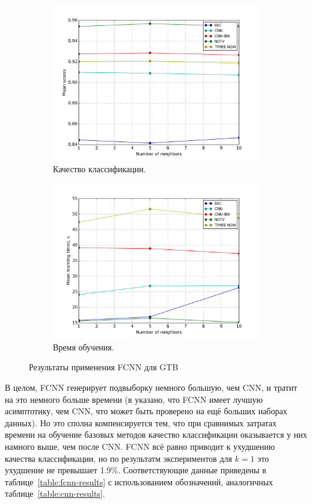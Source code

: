 \begin{figure}
	\centering
	\begin{subfigure}{0.45\textwidth}
		\includegraphics[width=\textwidth]{images/fcnn-gradboosting.png}
		\caption{Качество классификации.}
	\end{subfigure}
	\begin{subfigure}{0.45\textwidth}
		\includegraphics[width=\textwidth]{images/fcnn-gradboostingTime.png}
		\caption{Время обучения.}
	\end{subfigure}
	\caption{Результаты применения FCNN для GTB}\label{fig:fcnn-gtb-results}
\end{figure}

В целом, FCNN генерирует подвыборку немного большую, чем CNN, и тратит на это немного больше времени (в \cite{angiulli} указано, что FCNN имеет лучшую асимптотику, чем CNN, что может быть проверено на ещё больших наборах данных). Но это сполна компенсируется тем, что при сравнимых затратах времени на обучение базовых методов качество классификации оказывается у них намного выше, чем после CNN. FCNN всё равно приводит к ухудшению качества классификации, но по результатм экспериментов для \(k=1\) это ухудшение не превышает 1.9\%. Соответствующие данные приведены в таблице~\ref{table:fcnn-results} с использованием обозначений, аналогичных таблице~\ref{table:cnn-results}.

